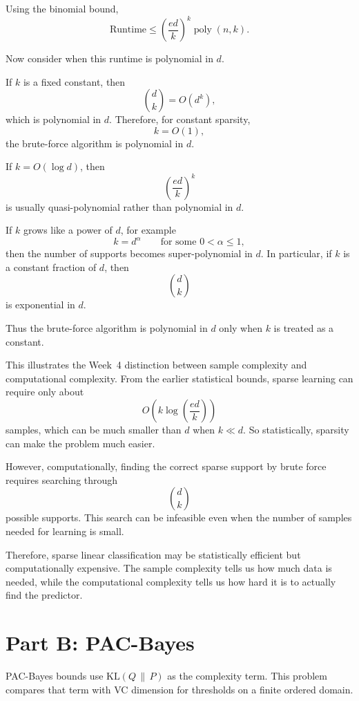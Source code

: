 \documentclass[11pt]{article}
\begin{document}
\begin{solutionbox}
Using the binomial bound,
\[
\boxed{
\text{Runtime}
\le
\left(\frac{ed}{k}\right)^k\operatorname{poly}(n,k).
}
\]

Now consider when this runtime is polynomial in $d$.

If $k$ is a fixed constant, then
\[
\binom{d}{k}=O(d^k),
\]
which is polynomial in $d$. Therefore, for constant sparsity,
\[
k=O(1),
\]
the brute-force algorithm is polynomial in $d$.

If $k=O(\log d)$, then
\[
\left(\frac{ed}{k}\right)^k
\]
is usually quasi-polynomial rather than polynomial in $d$.

If $k$ grows like a power of $d$, for example
\[
k=d^\alpha
\qquad\text{for some }0<\alpha\le 1,
\]
then the number of supports becomes super-polynomial in $d$. In particular, if $k$ is a constant fraction of $d$, then
\[
\binom{d}{k}
\]
is exponential in $d$.

Thus the brute-force algorithm is polynomial in $d$ only when $k$ is treated as a constant.

\medskip

This illustrates the Week~4 distinction between sample complexity and computational complexity. From the earlier statistical bounds, sparse learning can require only about
\[
O\!\left(k\log\left(\frac{ed}{k}\right)\right)
\]
samples, which can be much smaller than $d$ when $k\ll d$. So statistically, sparsity can make the problem much easier.

However, computationally, finding the correct sparse support by brute force requires searching through
\[
\binom{d}{k}
\]
possible supports. This search can be infeasible even when the number of samples needed for learning is small.

Therefore, sparse linear classification may be statistically efficient but computationally expensive. The sample complexity tells us how much data is needed, while the computational complexity tells us how hard it is to actually find the predictor.

\end{solutionbox}

\section{Part B: PAC-Bayes}
PAC-Bayes bounds use $\mathrm{KL}(Q \,\|\, P)$ as the complexity term. This problem compares 
that term with VC dimension for thresholds on a finite ordered domain.
\end{document}
